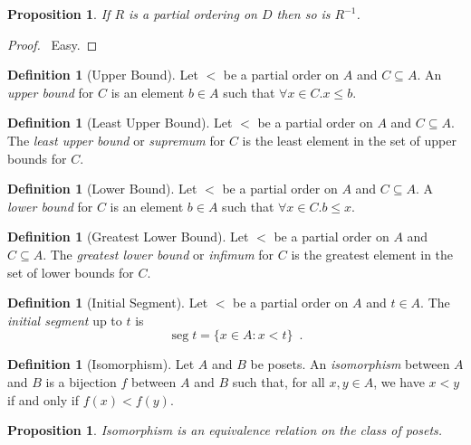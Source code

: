 \documentclass{report}
\let\qed\relax
\newtheorem{proposition}[axiom]{Proposition}
\theoremstyle{definition}
\newtheorem{definition}[axiom]{Definition}
\newcommand{\inv}[1]{\ensuremath{{#1}^{-1}}}
\newcommand{\seg}{\ensuremath{\operatorname{seg}}}
\begin{document}
    \begin{proposition}
        If $R$ is a partial ordering on $D$ then so is $\inv{R}$.
    \end{proposition}

    \begin{proof}
        \pf\ Easy. \qed
    \end{proof}

    \begin{definition}[Upper Bound]
        Let $<$ be a partial order on $A$ and $C \subseteq A$. An \emph{upper bound} for $C$ is an element
        $b \in A$ such that $\forall x \in C. x \leq b$.
    \end{definition}

    \begin{definition}[Least Upper Bound]
        Let $<$ be a partial order on $A$ and $C \subseteq A$. The \emph{least upper bound} or \emph{supremum}
        for $C$ is the least element in the set of upper bounds for $C$.
    \end{definition}
    
    \begin{definition}[Lower Bound]
        Let $<$ be a partial order on $A$ and $C \subseteq A$. A \emph{lower bound} for $C$ is an element
        $b \in A$ such that $\forall x \in C. b \leq x$.
    \end{definition}

    \begin{definition}[Greatest Lower Bound]
        Let $<$ be a partial order on $A$ and $C \subseteq A$. The \emph{greatest lower bound} or 
        \emph{infimum}
        for $C$ is the greatest element in the set of lower bounds for $C$.
    \end{definition}

    \begin{definition}[Initial Segment]
        Let $<$ be a partial order on $A$ and $t \in A$. The \emph{initial segment} up to $t$ is
        \[ \seg t = \{ x \in A : x < t \} \enspace . \]
    \end{definition}

    \begin{definition}[Isomorphism]
        Let $A$ and $B$ be posets. An \emph{isomorphism} between $A$ and $B$ is a bijection $f$ between $A$
        and $B$ such that, for all $x, y \in A$, we have $x < y$ if and only if $f(x) < f(y)$.
    \end{definition}

    \begin{proposition}
        Isomorphism is an equivalence relation on the class of posets.
    \end{proposition}
\end{document}
